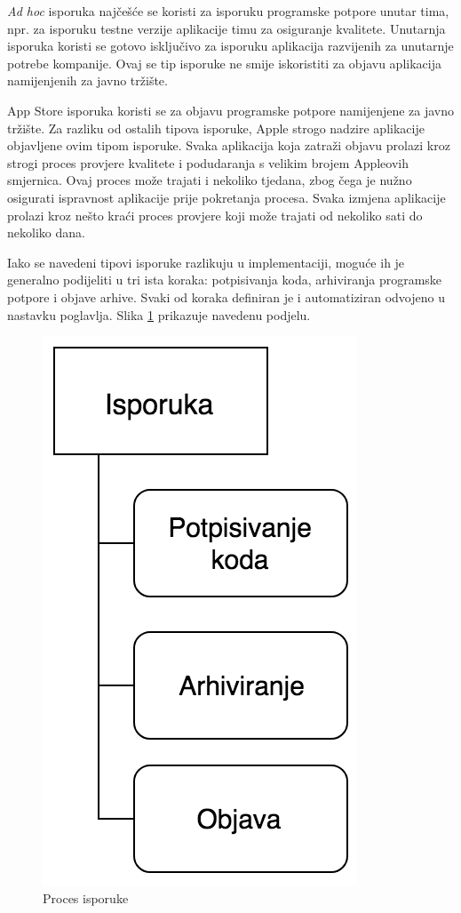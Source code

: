 \documentclass[times, utf8, diplomski, numeric]{fer}
\begin{document}
\textit{Ad hoc} isporuka najčešće se koristi za isporuku programske potpore unutar tima, npr. za isporuku testne verzije aplikacije timu za osiguranje kvalitete. Unutarnja isporuka koristi se gotovo isključivo za isporuku aplikacija razvijenih za unutarnje potrebe kompanije. Ovaj se tip isporuke ne smije iskoristiti za objavu aplikacija namijenjenih za javno tržište.

App Store isporuka koristi se za objavu programske potpore namijenjene za javno tržište. Za razliku od ostalih tipova isporuke, Apple strogo nadzire aplikacije objavljene ovim tipom isporuke. Svaka aplikacija koja zatraži objavu prolazi kroz strogi proces provjere kvalitete i podudaranja s velikim brojem Appleovih smjernica. Ovaj proces može trajati i nekoliko tjedana, zbog čega je nužno osigurati ispravnost aplikacije prije pokretanja procesa. Svaka izmjena aplikacije prolazi kroz nešto kraći proces provjere koji može trajati od nekoliko sati do nekoliko dana.

Iako se navedeni tipovi isporuke razlikuju u implementaciji, moguće ih je generalno podijeliti u tri ista koraka: potpisivanja koda, arhiviranja programske potpore i objave arhive. Svaki od koraka definiran je i automatiziran odvojeno u nastavku poglavlja. Slika \ref{fig:ContinuousDelivery} prikazuje navedenu podjelu.

\begin{figure}
\centering
\includegraphics[scale=0.6]{ContinuousDelivery}
\caption{Proces isporuke}
\label{fig:ContinuousDelivery}
\end{figure}
\end{document}
